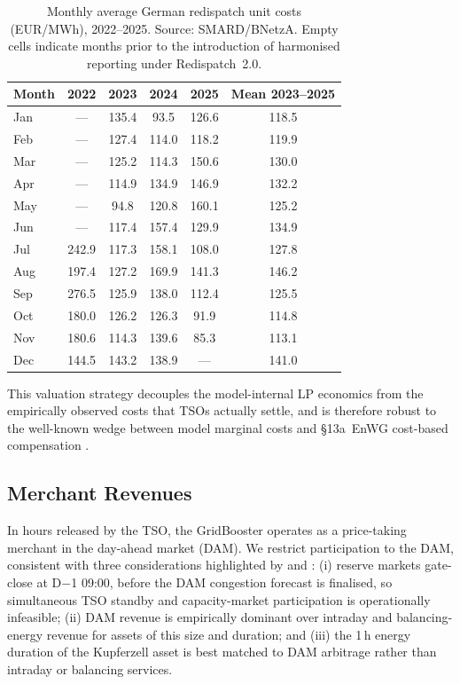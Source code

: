 \begin{table}[htbp]
\centering
\caption{Monthly average German redispatch unit costs (EUR/MWh), 2022--2025. Source: SMARD/BNetzA. Empty cells indicate months prior to the introduction of harmonised reporting under Redispatch~2.0.}
\label{Tab:Redispatch_Cost_2022_2025}
\small
\begin{tabular}{lccccc}
\toprule
Month & 2022 & 2023 & 2024 & 2025 & Mean 2023--2025 \\
\midrule
Jan & ---   & 135.4 & 93.5  & 126.6 & 118.5 \\
Feb & ---   & 127.4 & 114.0 & 118.2 & 119.9 \\
Mar & ---   & 125.2 & 114.3 & 150.6 & 130.0 \\
Apr & ---   & 114.9 & 134.9 & 146.9 & 132.2 \\
May & ---   & 94.8  & 120.8 & 160.1 & 125.2 \\
Jun & ---   & 117.4 & 157.4 & 129.9 & 134.9 \\
Jul & 242.9 & 117.3 & 158.1 & 108.0 & 127.8 \\
Aug & 197.4 & 127.2 & 169.9 & 141.3 & 146.2 \\
Sep & 276.5 & 125.9 & 138.0 & 112.4 & 125.5 \\
Oct & 180.0 & 126.2 & 126.3 & 91.9  & 114.8 \\
Nov & 180.6 & 114.3 & 139.6 & 85.3  & 113.1 \\
Dec & 144.5 & 143.2 & 138.9 & ---   & 141.0 \\
\bottomrule
\end{tabular}
\end{table}
 
This valuation strategy decouples the model-internal LP economics from the empirically observed costs that TSOs actually settle, and is therefore robust to the well-known wedge between model marginal costs and \S13a~EnWG cost-based compensation \citep{staudt_2018_predicting_redispatch_in_the_german_elelectricity_market, BNetzA_Redispatch_Kosten_2023}.

 


\subsection{Merchant Revenues}\label{Subsec3:Meth_Market_Revenues}
 
In hours released by the TSO, the GridBooster operates as a price-taking merchant in the day-ahead market (DAM). We restrict participation to the DAM, consistent with three considerations highlighted by \citet{Fluence_Consentec_2022_GridBooster_Profitability_Assessment} and \citet{Consentec_Fluence_2025_GridBooster_Monetary_Valuation}: (i) reserve markets gate-close at D$-$1 09:00, before the DAM congestion forecast is finalised, so simultaneous TSO standby and capacity-market participation is operationally infeasible; (ii) DAM revenue is empirically dominant over intraday and balancing-energy revenue for assets of this size and duration; and (iii) the 1\,h energy duration of the Kupferzell asset is best matched to DAM arbitrage rather than intraday or balancing services.
 
